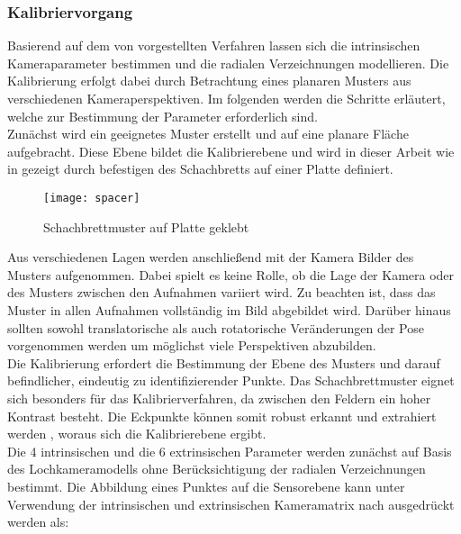 \subsubsection{Kalibriervorgang}
Basierend auf dem von  vorgestellten Verfahren lassen sich die intrinsischen Kameraparameter bestimmen und die radialen Verzeichnungen modellieren. Die Kalibrierung erfolgt dabei durch Betrachtung eines planaren Musters aus verschiedenen Kameraperspektiven. Im folgenden werden die Schritte erläutert, welche zur Bestimmung der Parameter erforderlich sind.\\

Zunächst wird ein geeignetes Muster erstellt und auf eine planare Fläche aufgebracht. Diese Ebene bildet die Kalibrierebene und wird in dieser Arbeit wie in  gezeigt durch befestigen des Schachbretts auf einer Platte definiert. 

\begin{figure}[ht]
	\begin{center}
		\texttt{[image: spacer]}
		\caption{Schachbrettmuster auf Platte geklebt}
		\label{fig.chesscalib}
	\end{center}
\end{figure}

Aus verschiedenen Lagen werden anschließend mit der Kamera Bilder des Musters aufgenommen. Dabei spielt es keine Rolle, ob die Lage der Kamera oder des Musters zwischen den Aufnahmen variiert wird. Zu beachten ist, dass das Muster in allen Aufnahmen vollständig im Bild abgebildet wird. Darüber hinaus sollten sowohl translatorische als auch rotatorische Veränderungen der Pose vorgenommen werden um möglichst viele Perspektiven abzubilden. \\

Die Kalibrierung erfordert die Bestimmung der Ebene des Musters und darauf befindlicher, eindeutig zu identifizierender Punkte. Das Schachbrettmuster eignet sich besonders für das Kalibrierverfahren, da zwischen den Feldern ein hoher Kontrast besteht. Die Eckpunkte können somit robust erkannt und extrahiert werden \red[Verfahren?], woraus sich die Kalibrierebene ergibt. \\

Die 4 intrinsischen und die 6 extrinsischen Parameter werden zunächst auf Basis des Lochkameramodells ohne Berücksichtigung der radialen Verzeichnungen bestimmt. Die Abbildung eines Punktes auf die Sensorebene kann unter Verwendung der intrinsischen und extrinsischen Kameramatrix nach  ausgedrückt werden als:

